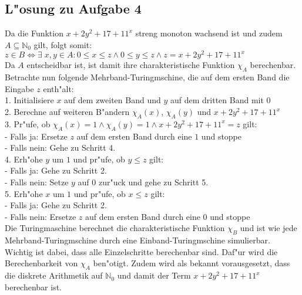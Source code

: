 \documentclass[10pt,oneside,onecolumn,a4paper,german,titlepage]{article}
\begin{document}
\subsection*{L"osung zu Aufgabe 4}
Da die Funktion $x+2y^2+17+11^x$ streng monoton wachsend ist und zudem $A \subseteq
\mathbb{N}_0$ gilt, folgt somit:\\
$z \in B \Leftrightarrow \exists \; x,y \in A: 0 \leq x \leq z \wedge 0 \leq y \leq z
\wedge z = x+2y^2+17+11^x$\\
Da $A$ entscheidbar ist, ist damit ihre charakteristische Funktion $\chi_A$
berechenbar.\\[4pt]
Betrachte nun folgende Mehrband-Turingmschine, die auf dem ersten Band die Eingabe
$z$ enth"alt:\\
1. Initialisiere $x$ auf dem zweiten Band und $y$ auf dem dritten Band mit $0$\\
2. Berechne auf weiteren B"andern $\chi_A(x)$, $\chi_A(y)$ und $x+2y^2+17+11^x$\\
3. Pr"ufe, ob $\chi_A(x) = 1 \wedge \chi_A(y) = 1 \wedge x+2y^2+17+11^x = z$ gilt:\\
- Falls ja: Ersetze $z$ auf dem ersten Band durch eine $1$ und stoppe\\
- Falls nein: Gehe zu Schritt 4.\\
4. Erh"ohe $y$ um $1$ und pr"ufe, ob $y \leq z$ gilt:\\
- Falls ja: Gehe zu Schritt 2.\\
- Falls nein: Setze $y$ auf $0$ zur"uck und gehe zu Schritt 5.\\
5. Erh"ohe $x$ um $1$ und pr"ufe, ob $x \leq z$ gilt:\\
- Falls ja: Gehe zu Schritt 2.\\
- Falls nein: Ersetze $z$ auf dem ersten Band durch eine $0$ und stoppe\\[4pt]
Die Turingmaschine berechnet die charakteristische Funktion $\chi_B$ und ist wie
jede Mehrband-Turingmschine durch eine Einband-Turingmschine simulierbar. Wichtig
ist dabei, dass alle Einzelschritte berechenbar sind. Daf"ur wird die Berechenbarkeit
von $\chi_A$ ben"otigt. Zudem wird als bekannt vorausgesetzt, dass die diskrete
Arithmetik auf $\mathbb{N}_0$ und damit der Term $x+2y^2+17+11^x$ berechenbar ist.
\end{document}

